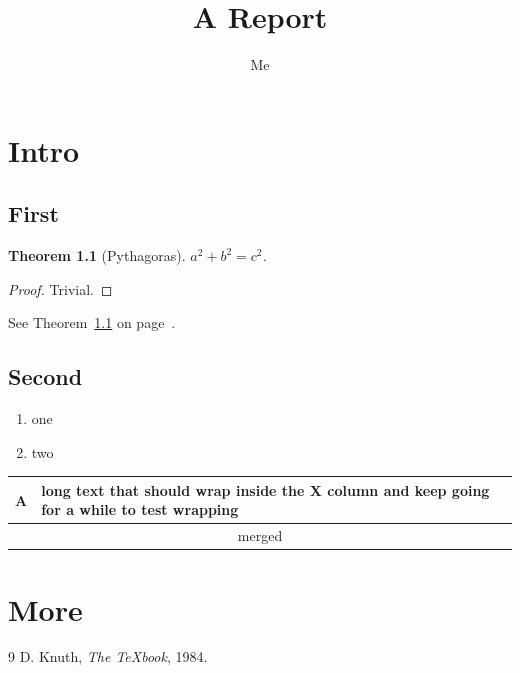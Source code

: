 \documentclass{report}
\title{A Report}\author{Me}
\newtheorem{thm}{Theorem}[chapter]
\begin{document}
\maketitle
\tableofcontents
\chapter{Intro}
\section{First}
\begin{thm}[Pythagoras]\label{t1} $a^2+b^2=c^2$. \end{thm}
\begin{proof} Trivial. \end{proof}
See Theorem~\ref{t1} on page~\pageref{t1}. \cite{knuth}
\lipsum[1-6]
\section{Second}
\begin{enumerate}[label=(\alph*)]
\item one \item two
\end{enumerate}
\begin{tabularx}{\textwidth}{|l|X|}\hline
A & long text that should wrap inside the X column and keep going for a while to test wrapping \\ \hline
\multicolumn{2}{|c|}{merged} \\ \hline
\end{tabularx}
\chapter{More}
\lipsum[1-12]
\begin{thebibliography}{9}
 D. Knuth, \emph{The TeXbook}, 1984.
\end{thebibliography}
\end{document}
